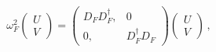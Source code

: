 \begin{equation}
\omega_F^2 \left( \begin{array}{c} U \\ V \end{array} \right)
= \left( \begin{array}{cc} D_F D_F^\dag ,& 0 \\
                       0,& D_F^\dag D_F \end{array} \right)
\left( \begin{array}{c} U \\ V \end{array} \right) \,,
\label{sqDir}
\end{equation}

